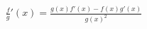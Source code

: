 \documentclass[preview]{standalone}
\begin{document}
\begin{align*}
\frac{f}{g}'(x) = \frac{g(x)f'(x)-f(x)g'(x)}{g(x)^2}
\end{align*}
\end{document}
